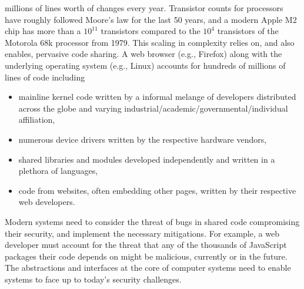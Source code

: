 millions of lines worth of changes every year.
Transistor counts for processors have roughly followed Moore's law for
the last 50 years, and a modern Apple M2 chip has more than a $10^{11}$
transistors compared to the $10^{4}$ transistors of the Motorola 68k processor
from 1979.
This scaling in complexity relies on, and also enables, pervasive code
sharing.
A web browser (e.g., Firefox) along with the underlying operating 
system (e.g., Linux) accounts for hundreds of millions of lines of code
including
\begin{itemize}
      \item mainline kernel code written by a informal melange of developers
            distributed across the globe and varying 
            industrial/academic/governmental/individual affiliation,
      \item numerous device drivers written by the respective hardware 
            vendors,
      \item shared libraries and modules developed independently and 
            written in a plethora of languages,
      \item code from websites, often embedding other pages,
            written by their respective web developers.
\end{itemize}
Modern systems need to consider the threat of bugs in shared code
compromising their security, and implement the necessary mitigations.
For example, a web developer must account for the threat that any of the
thousands of JavaScript packages their code depends on might be malicious,
currently or in the future.
The abstractions and interfaces at the core of computer systems need to
enable systems to face up to today's security challenges.


